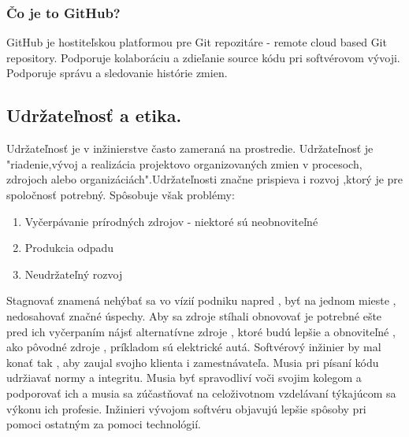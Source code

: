 \documentclass[10pt,oneside,slovak,a4paper]{article}
\begin{document}
\subsubsection{Čo je to GitHub?}
GitHub je hostiteľskou platformou pre Git repozitáre - remote cloud based Git repository. Podporuje kolaboráciu a  zdieľanie source kódu pri softvérovom vývoji. Podporuje správu a sledovanie histórie zmien.
\subsection{Udržateľnosť a etika.}
Udržateľnosť je v inžinierstve často zameraná na prostredie. Udržateľnosť je "riadenie,vývoj a realizácia projektovo organizovaných zmien v procesoch, zdrojoch alebo organizáciách".Udržateľnosti značne prispieva i rozvoj ,ktorý je pre spoločnosť potrebný. Spôsobuje však problémy:
\begin{enumerate}
    \item{Vyčerpávanie prírodných zdrojov - niektoré sú neobnoviteľné}
    \item{Produkcia odpadu}
    \item{Neudržateľný rozvoj}
\end{enumerate}
Stagnovať znamená nehýbať sa vo vízií podniku napred , byť na jednom mieste , nedosahovať značné úspechy.
Aby sa zdroje stíhali obnovovať je potrebné ešte pred ich vyčerpaním nájsť alternatívne zdroje , ktoré budú lepšie a obnoviteľné , ako pôvodné zdroje , príkladom sú elektrické autá.
Softvérový inžinier by mal konať tak , aby zaujal svojho klienta i zamestnávateľa. Musia pri písaní kódu udržiavať normy a integritu. Musia byť spravodliví voči svojim kolegom a podporovať ich a musia sa zúčastňovať na celoživotnom vzdelávaní týkajúcom sa výkonu ich profesie. Inžinieri vývojom softvéru objavujú lepšie spôsoby pri pomoci ostatným za pomoci technológií.
\newpage

\end{document}

